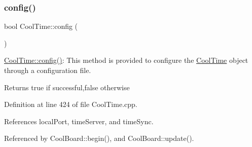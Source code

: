 \subsubsection{\texorpdfstring{config()}{config()}\hspace{0.1cm}{\footnotesize\ttfamily [1/2]}}
{\footnotesize\ttfamily bool Cool\+Time\+::config (\begin{DoxyParamCaption}{ }\end{DoxyParamCaption})}

\hyperlink{classCoolTime_a87c28260c1bc77091162cbcf1ee2e129}{Cool\+Time\+::config()}\+: This method is provided to configure the \hyperlink{classCoolTime}{Cool\+Time} object through a configuration file.

\begin{DoxyReturn}{Returns}
true if successful,false otherwise 
\end{DoxyReturn}


Definition at line 424 of file Cool\+Time.\+cpp.



References local\+Port, time\+Server, and time\+Sync.



Referenced by Cool\+Board\+::begin(), and Cool\+Board\+::update().



